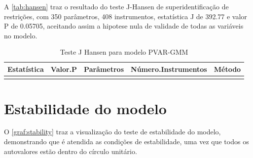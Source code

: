 \documentclass[
  12pt,
  12pt,
  openright,
  oneside,
  a4paper,
  chapter=TITLE,
  section=TITLE,
  subsection=TITLE,
  subsubsection=TITLE,
  english,
  portugues,
  sumario=tradicional]{abntex2}
\begin{document}
A \autoref{tab:hansen} traz o resultado do teste J-Hansen de superidentificação de restrições, com 350 parâmetros, 408 instrumentos, estatística J de 392.77 e valor P de 0.05705, aceitando assim a hipotese nula de validade de todas as variáveis no modelo.

\begin{table}[!hbtp]
\caption{Teste J Hansen para modelo PVAR-GMM}
\vspace{-1mm}

\begin{tabu} to 
\toprule
Estatística & Valor.P & Parâmetros & Número.Instrumentos & Método\\
\midrule
{} &  &  &  & \\
\bottomrule
\end{tabu}
\vspace{1mm}
\label{tab:hansen}
\vspace{-2mm}
\end{table}

\section{Estabilidade do modelo}

O \autoref{graf:stability} traz a visualização do teste de estabilidade do modelo, demonstrando que é atendida as condições de estabilidade, uma vez que todos os autovalores estão dentro do círculo unitário.
\end{document}
